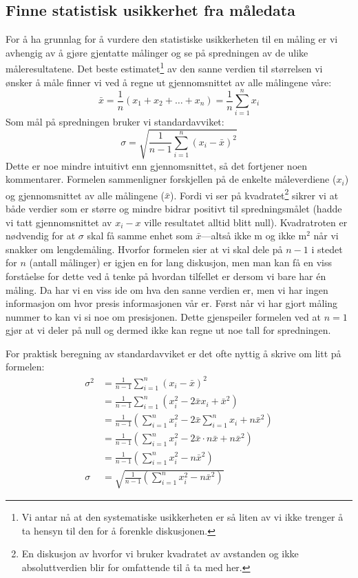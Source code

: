 \subsection{Finne statistisk usikkerhet fra måledata}
For å ha grunnlag for å vurdere den statistiske usikkerheten til en måling er vi avhengig av å gjøre gjentatte målinger og se på spredningen av de ulike måleresultatene. Det beste estimatet\footnote{Vi antar nå at den systematiske usikkerheten er så liten av vi ikke trenger å ta hensyn til den for å forenkle diskusjonen.} av den sanne verdien til størrelsen vi ønsker å måle finner vi ved å regne ut gjennomsnittet av alle målingene våre:
\begin{equation}
	\bar{x} = \frac{1}{n}\left(x_1 + x_2 +\ldots + x_n\right) = \frac{1}{n}\sum_{i=1}^n x_i
\end{equation}
Som mål på spredningen bruker vi standardavviket:
\begin{equation}
	\sigma = \sqrt{\frac{1}{n-1}\sum_{i=1}^n(x_i-\bar{x})^2}
\end{equation}
Dette er noe mindre intuitivt enn gjennomsnittet, så det fortjener noen kommentarer. Formelen sammenligner forskjellen på de enkelte måleverdiene ($x_i$) og gjennomsnittet av alle målingene ($\bar{x}$). Fordi vi ser på kvadratet\footnote{En diskusjon av hvorfor vi bruker kvadratet av avstanden og ikke absoluttverdien blir for omfattende til å ta med her.} sikrer vi at både verdier som er større og mindre bidrar positivt til spredningsmålet (hadde vi tatt gjennomsnittet av $x_i-x$ ville resultatet alltid blitt null). Kvadratroten er nødvendig for at $\sigma$ skal få samme enhet som $\bar{x}$---altså ikke $\mathrm{m}$ og ikke $\mathrm{m^2}$ når vi snakker om lengdemåling. Hvorfor formelen sier at vi skal dele på $n-1$ i stedet for $n$ (antall målinger) er igjen en for lang diskusjon, men man kan få en viss forståelse for dette ved å tenke på hvordan tilfellet er dersom vi bare har \'en måling. Da har vi en viss ide om hva den sanne verdien er, men vi har ingen informasjon om hvor presis informasjonen vår er. Først når vi har gjort måling nummer to kan vi si noe om presisjonen. Dette gjenspeiler formelen ved at $n=1$ gjør at vi deler på null og dermed ikke kan regne ut noe tall for spredningen.

For praktisk beregning av standardavviket er det ofte nyttig å skrive om litt på formelen:
\begin{align}
	\sigma^2 &=\frac{1}{n-1}\sum_{i=1}^n(x_i-\bar{x})^2 \nonumber \\
	&= \frac{1}{n-1}\sum_{i=1}^{n}\left(x_i^2 - 2\bar{x}x_i + \bar{x}^2\right) \nonumber\\ 
	&= \frac{1}{n-1}\left(\sum_{i=1}^nx_i^2 -2\bar{x}\sum_{i=1}^nx_i + n\bar{x}^2\right) \nonumber\\
	&= \frac{1}{n-1}\left(\sum_{i=1}^nx_i^2 -2\bar{x}\cdot n\bar{x} + n\bar{x}^2\right) \nonumber\\
	&= \frac{1}{n-1}\left(\sum_{i=1}^nx_i^2  - n\bar{x}^2\right) \nonumber\\
	\sigma &= \sqrt{\frac{1}{n-1}\left(\sum_{i=1}^nx_i^2  - n\bar{x}^2\right)}
\end{align}


